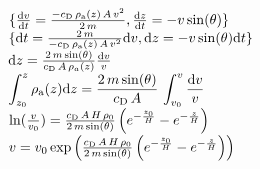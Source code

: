 \documentclass{article}
\begin{document}
$\{\frac{{\rm d}v}{{\rm d}t}=\frac{-c_{\rm D}\,\rho_{\rm a}(z)\,A\,v^{\rm 2}}{2\,m},\frac{{\rm d}z}{{\rm d}t}=-v\,{\rm sin}(\theta)\}$\\[0.2cm]
$\{{\rm d}t=\frac{2\,m}{-c_{\rm D}\,\rho_{\rm a}(z)\,A\,v^{\rm 2}}{\rm d}v,{\rm d}z=-v\,{\rm sin}(\theta){\rm d}t\}$\\[0.3cm]
${\rm d}z=\frac{2\,m\,{\rm sin}(\theta)}{c_{\rm D}\,A\,\rho_a(z)}\frac{{\rm d}v}{v}$\\[0.3cm]
$\displaystyle\int_{z_0}^{z}{\rho_{\rm a}(z){\rm d}z}=\frac{2\,m\,{\rm sin}(\theta)}{c_{\rm D}\,A}\,\int_{v_0}^{v}\frac{{\rm d}v}{v}$\\[0.3cm]
${\rm ln}(\frac{v}{v_0})=\frac{c_{\rm D}\,A\,H\,\rho_0}{2\,m\,{\rm sin}(\theta)}\left(e^{-\frac{z_0}{H}}-e^{-\frac{z}{H}}\right)$\\[0.3cm]
$v=v_0\,{\rm exp}\left(\frac{c_{\rm D}\,A\,H\,\rho_0}{2\,m\,{\rm sin}(\theta)}\left(e^{-\frac{z_0}{H}}-e^{-\frac{z}{H}}\right)\right)$\\[0.3cm]
\end{document}
